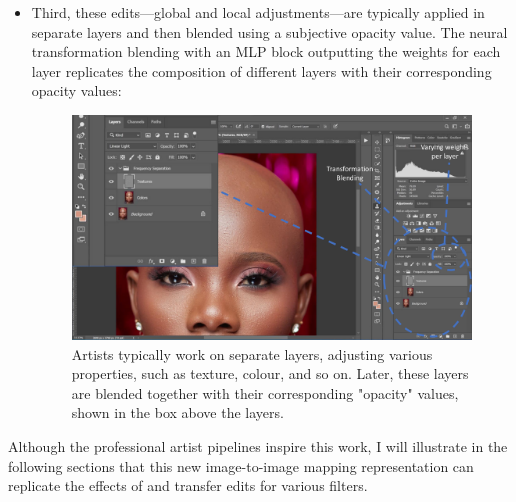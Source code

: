 \begin{itemize}
\begin{figure}[ht]
\label{fig:PS-brush}
\end{figure}

\item Third, these edits—global and local adjustments—are typically applied in separate layers and then blended using a subjective opacity value. The neural transformation blending with an MLP block outputting the weights for each layer replicates the composition of different layers with their corresponding opacity values:

\begin{figure}[ht]
\centering
\includegraphics[width=\columnwidth]{Chapters/detail-retouching-figs/PS2.pdf}
    \caption{Artists typically work on separate layers, adjusting various properties, such as texture, colour, and so on. Later, these layers are blended together with their corresponding "opacity" values, shown in the box above the layers.}

\label{fig:PS-all-together}
\end{figure}

\end{itemize}
Although the professional artist pipelines inspire this work, I will illustrate in the following sections that this new image-to-image mapping representation can replicate the effects of and transfer edits for various filters.